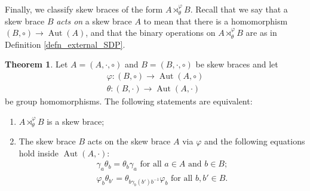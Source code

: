 \documentclass[12pt,a4paper, reqno]{amsart}
\theoremstyle{definition}
\newtheorem{theorem}{Theorem}[section]
\DeclareMathOperator{\Aut}{\mbox{Aut}}
\begin{document}
Finally, we classify skew braces of the form $ A \rtimes_{\theta}^{\varphi} B $. Recall that we say that a skew brace $ B $ \textit{acts on} a skew brace $ A $ to mean that there is a homomorphism $ (B,\circ) \rightarrow \Aut(A) $, and that the binary operations on $ A \rtimes_{\theta}^{\varphi} B $ are as in Definition \ref{defn_external_SDP}.

\begin{theorem} \label{thm_external_semidirect}
Let $ A=(A,\cdot,\circ) $ and $ B=(B,\cdot,\circ) $ be skew braces and let
\begin{eqnarray*}
\varphi : (B,\circ) \rightarrow \Aut(A,\circ) \\
\theta : (B,\cdot) \rightarrow \Aut(A,\cdot)
\end{eqnarray*}
be group homomorphisms. The following statements are equivalent:
\begin{enumerate}
\item \label{enum_external_sdp_1} $ A \rtimes_{\theta}^{\varphi} B $ is a skew brace;
\item \label{enum_external_sdp_2} The skew brace $ B $ acts on the skew brace $ A $ via $ \varphi $ and the following equations hold inside $ \Aut(A,\cdot) $: 
\begin{eqnarray}
\gamma_{a} \theta_{b} = \theta_{b} \gamma_{a} \mbox{ for all } a \in A \mbox{ and } b \in B; \label{eqn_external_sdp_1} \\
\varphi_{b} \theta_{b'} = \theta_{b \gamma_{b}(b') b^{-1}} \varphi_{b} \mbox{ for all } b, b' \in B. \label{eqn_external_sdp_2}
\end{eqnarray}
\end{enumerate}
\end{theorem}
\end{document}
